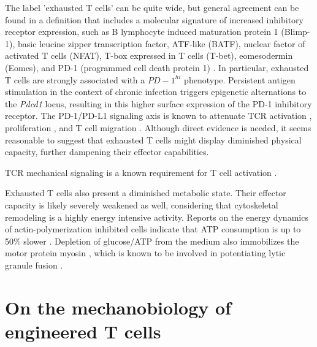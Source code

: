 The label 'exhausted T cells' can be quite wide, but general agreement can be found in a definition that includes a molecular signature of increased inhibitory receptor expression, such as B lymphocyte induced maturation protein 1 (Blimp-1), basic leucine zipper transcription factor, ATF-like (BATF), nuclear factor of activated T cells (NFAT), T-box expressed in T cells (T-bet), eomesodermin (Eomes), and PD-1 (programmed cell death protein 1) \cite{Wherry2011, Quigley2010, Doering2012, Wherry2007, Wang2012, Rangachari2012, Shin2009, Paley2012, Larsson2013}. In particular, exhausted T cells are strongly associated with a $PD-1^{hi}$ phenotype. Persistent antigen stimulation in the context of chronic infection triggers epigenetic alternations to the \textit{Pdcd1} locus, resulting in this higher surface expression of the PD-1 inhibitory receptor. The PD-1/PD-L1 signaling axis is known to attenuate TCR activation \cite{Mizuno2019}, proliferation \cite{Schietinger2014}, and T cell migration \cite{Zinselmeyer2013}. Although direct evidence is needed, it seems reasonable to suggest that exhausted T cells might display diminished physical capacity, further dampening their effector capabilities.

TCR mechanical signaling is a known requirement for T cell activation \cite{Hu2016}.

Exhausted T cells also present a diminished metabolic state. Their effector capacity is likely severely weakened as well, considering that cytoskeletal remodeling is a highly energy intensive activity. Reports on the energy dynamics of actin-polymerization inhibited cells indicate that ATP consumption is up to 50\% slower \cite{Bernstein2002, Ahmed2015}. Depletion of glucose/ATP from the medium also immobilizes the motor protein myosin \cite{Xu2014}, which is known to be involved in potentiating lytic granule fusion \cite{Basu2016}.

\section{On the mechanobiology of engineered T cells}

